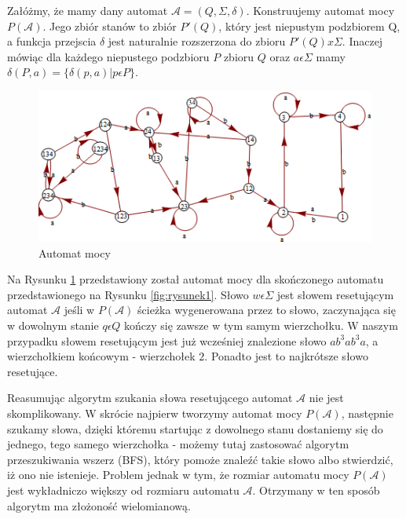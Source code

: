 \documentclass[12pt,a4paper]{article}
\begin{document}
Za{\l}\'{o}\.{z}my, \.{z}e mamy dany automat  $\mathscr{A}=(Q, \Sigma, \delta)$. Konstruujemy automat mocy $P(\mathscr{A})$. Jego zbi\'{o}r stan\'{o}w to zbi\'{o}r $P'(Q)$, kt\'{o}ry jest niepustym podzbiorem Q, a funkcja przejscia $\delta$ jest naturalnie rozszerzona do zbioru $P'(Q)x\Sigma$. Inaczej m\'{o}wi\k{a}c dla ka\.{z}dego niepustego podzbioru $P$ zbioru $Q$ oraz $a \epsilon \Sigma$ mamy $\delta(P,a)=\{\delta(p,a) | p\epsilon P\}$.
\\
\begin{figure}[H]
    \includegraphics[width=1.1\textwidth]{rysunek6}
    \caption{Automat mocy}
    \label{fig:rysunek6}
\end{figure}

Na Rysunku \ref{fig:rysunek6} przedstawiony zosta{\l} automat mocy dla sko\'{n}czonego automatu przedstawionego na Rysunku \ref{fig:rysunek1}. S{\l}owo $w \epsilon \Sigma$ jest s{\l}owem resetuj\k{a}cym automat $\mathscr{A}$ je\'{s}li w $P(\mathscr{A})$ \'{s}cie\.{z}ka wygenerowana przez to s{\l}owo, zaczynaj\k{a}ca si\k{e} w dowolnym stanie $q \epsilon Q$ ko\'{n}czy si\k{e} zawsze w tym samym wierzcho{\l}ku. W naszym przypadku s{\l}owem resetuj\k{a}cym jest ju\.{z} wcze\'{s}niej znalezione s{\l}owo $ab^3ab^3a$, a wierzcho{\l}kiem ko\'{n}cowym - wierzcho{\l}ek $2$. Ponadto jest to najkr\'{o}tsze s{\l}owo resetuj\k{a}ce. 

Reasumuj\k{a}c algorytm szukania s{\l}owa resetuj\k{a}cego automat $\mathscr{A}$ nie jest skomplikowany. W skr\'{o}cie najpierw tworzymy automat mocy $P(\mathscr{A})$, nast\k{e}pnie szukamy s{\l}owa, dzi\k{e}ki kt\'{o}remu startuj\k{a}c z dowolnego stanu dostaniemy si\k{e} do jednego, tego samego wierzcho{\l}ka - mo\.{z}emy tutaj zastosowa\'{c} algorytm przeszukiwania 
wszerz (BFS), kt\'{o}ry pomo\.{z}e znale\'{z}\'{c} takie s{\l}owo albo stwierdzi\'{c}, i\.{z} ono nie istenieje. Problem jednak w tym, \.{z}e rozmiar automatu mocy $P(\mathscr{A})$ jest wyk{\l}adniczo wi\k{e}kszy od rozmiaru automatu $\mathscr{A}$. Otrzymany w ten spos\'{o}b algorytm ma z{\l}o\.{z}ono\'{s}\'{c} wielomianow\k{a}.
\end{document}
